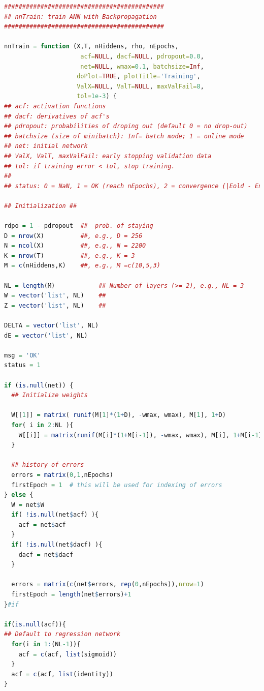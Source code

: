 \begin{lstlisting}[language=R,
caption={ฟังชั่น \texttt{nnTrain} และ \texttt{nnOutput}},
label={lst: deep DNN09 train}]
############################################
## nnTrain: train ANN with Backpropagation
############################################

nnTrain = function (X,T, nHiddens, rho, nEpochs,
                     acf=NULL, dacf=NULL, pdropout=0.0,
                     net=NULL, wmax=0.1, batchsize=Inf,
                    doPlot=TRUE, plotTitle='Training',
                    ValX=NULL, ValT=NULL, maxValFail=8, 
                    tol=1e-3) {
## acf: activation functions
## dacf: derivatives of acf's
## pdropout: probabilities of droping out (default 0 = no drop-out)
## batchsize (size of minibatch): Inf= batch mode; 1 = online mode
## net: initial network
## ValX, ValT, maxValFail: early stopping validation data
## tol: if training error < tol, stop training.
## 
## status: 0 = NaN, 1 = OK (reach nEpochs), 2 = convergence (|Eold - Enew| < tol), 3 = early stoppoing

## Initialization ##
 
rdpo = 1 - pdropout  ##  prob. of staying
D = nrow(X)          ##, e.g., D = 256
N = ncol(X)          ##, e.g., N = 2200
K = nrow(T)          ##, e.g., K = 3
M = c(nHiddens,K)    ##, e.g., M =c(10,5,3)

NL = length(M)            ## Number of layers (>= 2), e.g., NL = 3
W = vector('list', NL)    ##
Z = vector('list', NL)    ##

DELTA = vector('list', NL)
dE = vector('list', NL)
  
msg = 'OK'
status = 1

if (is.null(net)) {
  ## Initialize weights

  W[[1]] = matrix( runif(M[1]*(1+D), -wmax, wmax), M[1], 1+D)
  for( i in 2:NL ){
    W[[i]] = matrix(runif(M[i]*(1+M[i-1]), -wmax, wmax), M[i], 1+M[i-1])
  }      

  ## history of errors
  errors = matrix(0,1,nEpochs)
  firstEpoch = 1  # this will be used for indexing of errors      
} else {
  W = net$W
  if( !is.null(net$acf) ){
    acf = net$acf
  }
  if( !is.null(net$dacf) ){
    dacf = net$dacf
  }

  errors = matrix(c(net$errors, rep(0,nEpochs)),nrow=1)
  firstEpoch = length(net$errors)+1
}#if

if(is.null(acf)){
## Default to regression network
  for(i in 1:(NL-1)){
    acf = c(acf, list(sigmoid))
  }    
  acf = c(acf, list(identity))
}


\end{lstlisting}
